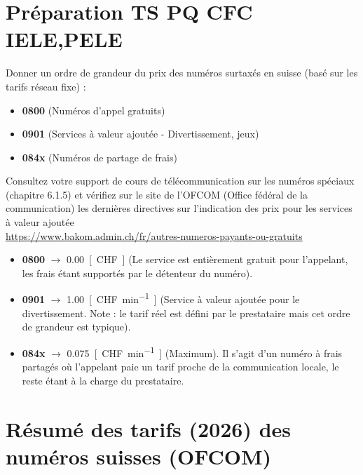 \documentclass[a4paper,12pt,answers,addpoints]{exam}
\begin{document}
	\unframedsolutions
	\pointsinmargin
	\bracketedpoints
	
\section*{Préparation TS PQ CFC IELE,PELE}
\begin{questions}
\question[9]
Donner un ordre de grandeur du prix des numéros surtaxés en suisse (basé sur les tarifs réseau fixe) :
\begin{itemize}
    \item \textbf{0800} (Numéros d'appel gratuits)
    \item \textbf{0901} (Services à valeur ajoutée - Divertissement, jeux)
    \item \textbf{084x} (Numéros de partage de frais)
\end{itemize}

Consultez votre support de cours de télécommunication sur les numéros spéciaux (chapitre 6.1.5) et vérifiez sur le site de l'OFCOM (Office fédéral de la communication) les dernières directives sur l'indication des prix pour les services à valeur ajoutée\\
     \url{https://www.bakom.admin.ch/fr/autres-numeros-payants-ou-gratuits}

\begin{solution}


\begin{itemize}
    \item \textbf{0800} $\rightarrow$ \qty{0.00}{[CHF]} (Le service est entièrement gratuit pour l'appelant, les frais étant supportés par le détenteur du numéro).
    \item \textbf{0901} $\rightarrow$ \qty{1.00}{[CHF\per\minute]} (Service à valeur ajoutée pour le divertissement. Note : le tarif réel est défini par le prestataire mais cet ordre de grandeur est typique).
    \item \textbf{084x} $\rightarrow$ \qty{0.075}{[CHF\per\minute]} (Maximum). Il s'agit d'un numéro à frais partagés où l'appelant paie un tarif proche de la communication locale, le reste étant à la charge du prestataire.
\end{itemize}

\section*{Résumé des tarifs (2026) des numéros suisses (OFCOM)}

\renewcommand{\arraystretch}{1.8} %


\end{solution}
\end{questions}
\end{document}
